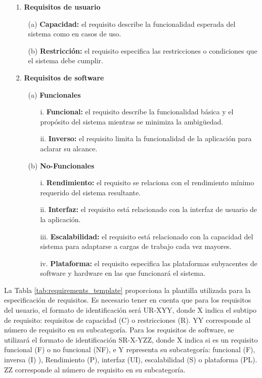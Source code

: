 \begin{itemize}
\item[1.] \textbf{Requisitos de usuario} 
	\begin{itemize}
		\item[(a)] \textbf{Capacidad:} el requisito describe la funcionalidad esperada del sistema como en casos de uso.
		\item[(b)] \textbf{Restricción:} el requisito especifica las restricciones o condiciones que el sistema debe cumplir.
	\end{itemize}	
\end{itemize}

\begin{itemize}
\item[2.] \textbf{Requisitos de software}
	\begin{itemize}
	\item[(a)] 	\textbf{Funcionales}
		\begin{itemize}
		\item[i.] 	\textbf{Funcional:} el requisito describe la funcionalidad básica y el propósito del sistema mientras se minimiza la ambigüedad.
		\item[ii.] 	\textbf{Inverso:} el requisito limita la funcionalidad de la aplicación para aclarar su alcance.
		\end{itemize}

	\item[(b)] 	\textbf{No-Funcionales}
		\begin{itemize}
		\item[i.] 	\textbf{Rendimiento:} el requisito se relaciona con el rendimiento mínimo requerido del sistema resultante.
		\item[ii.] 	\textbf{Interfaz:} el requisito está relacionado con la interfaz de usuario de la aplicación.
		\item[iii.] 	\textbf{Escalabilidad:} el requisito está relacionado con la capacidad del sistema para adaptarse a cargas de trabajo cada vez mayores.
		\item[iv.] 	\textbf{Plataforma:} el requisito especifica las plataformas subyacentes de software y hardware en las que funcionará el sistema.
		\end{itemize}			
	\end{itemize}
\end{itemize}

La Tabla \ref{tab:requirements_template} proporciona la plantilla utilizada para la especificación de requisitos. Es necesario tener en cuenta que para los requisitos del usuario, el formato de identificación será UR-XYY, donde X indica el subtipo de requisito: requisitos de capacidad (C) o restricciones (R). YY corresponde al número de requisito en su subcategoría. Para los requisitos de software, se utilizará el formato de identificación SR-X-YZZ, donde X indica si es un requisito funcional (F) o no funcional (NF), e Y representa su subcategoría: funcional (F), inversa (I) ), Rendimiento (P), interfaz (UI), escalabilidad (S) o plataforma (PL). ZZ corresponde al número de requisito en su subcategoría.

